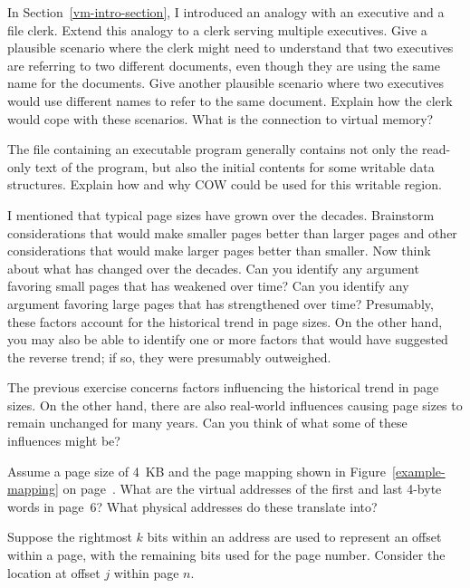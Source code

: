 \begin{chapterEnumerate}
\item
In Section~\ref{vm-intro-section}, I introduced an analogy with an
executive and a file clerk.  Extend this analogy to a clerk serving
multiple executives.  Give a plausible scenario where the clerk might
need to understand that two executives are referring to two different
documents, even though they are using the same name for the documents.
Give another plausible scenario where two executives would use
different names to refer to the same document.  Explain how the clerk
would cope with these scenarios.  What is the connection to virtual
memory?
\item
The file containing an executable program generally contains not only
the read-only text of the program, but also the initial contents for
some writable data structures.  Explain how and why COW could be used
for this writable region.
\item\label{page-size-execercise-1}
I mentioned that typical page sizes have grown over the decades.
Brainstorm considerations that would make smaller pages better than
larger pages and other considerations that would make larger pages better than
smaller.  Now think about what has changed over the decades.  Can you
identify any argument favoring small pages that has weakened over
time?  Can you identify any argument favoring large pages that has
strengthened over time?  Presumably, these factors account for the
historical trend in page sizes.  On the other hand, you may also be
able to identify one or more factors that would have suggested the
reverse trend; if so, they were presumably outweighed.
\item\label{page-size-execercise-2}
The previous exercise concerns factors influencing the historical
trend in page sizes.  On the other hand, there are also real-world
influences causing page sizes to remain unchanged for many years.  Can
you think of what some of these influences might be?
\item\label{page-6-translation-exercise}
Assume a page size of 4~KB and the page mapping shown in
Figure~\ref{example-mapping} on page~\pageref{example-mapping}.  What are the virtual addresses of the
first and last 4-byte words in page~6?  What physical addresses do
these translate into?
\item
Suppose the rightmost $k$ bits within an address are used to represent
an offset within a page, with the remaining bits used for the page
number.  Consider the location at offset  $j$
within page $n$.

\end{chapterEnumerate}

